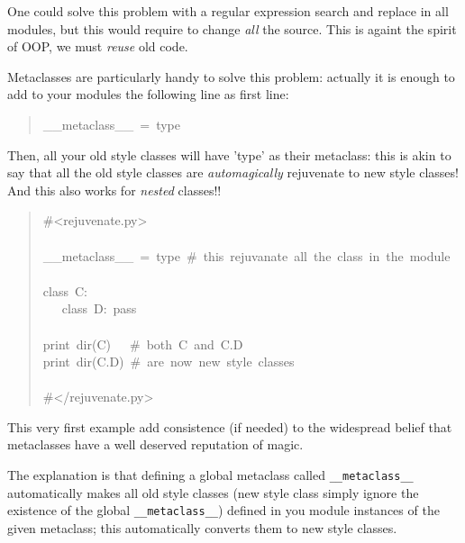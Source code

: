 \documentclass[10pt,english]{article}
\begin{document}
One could solve this problem with a regular expression search and replace
in all modules, but this would require to change \emph{all} the source.
This is againt the spirit of OOP, we must \emph{reuse} old code.

Metaclasses are particularly handy to solve this problem: actually it is
enough to add to your modules the following line as first line:
\begin{quote}
\begin{ttfamily}\begin{flushleft}
\mbox{{\_}{\_}metaclass{\_}{\_}~=~type}
\end{flushleft}\end{ttfamily}
\end{quote}

Then, all your old style classes will have 'type' as their metaclass: this
is akin to say that all the old style classes  are \emph{automagically} rejuvenate 
to new style classes! And this also works for \emph{nested} classes!!
\begin{quote}
\begin{ttfamily}\begin{flushleft}
\mbox{{\#}<rejuvenate.py>}\\
\mbox{}\\
\mbox{{\_}{\_}metaclass{\_}{\_}~=~type~{\#}~this~rejuvanate~all~the~class~in~the~module}\\
\mbox{}\\
\mbox{class~C:}\\
\mbox{~~~class~D:~pass}\\
\mbox{}\\
\mbox{print~dir(C)~~~{\#}~both~C~and~C.D}\\
\mbox{print~dir(C.D)~{\#}~are~now~new~style~classes}\\
\mbox{}\\
\mbox{{\#}</rejuvenate.py>}
\end{flushleft}\end{ttfamily}
\end{quote}

This very first example add consistence (if needed) to the
widespread belief that metaclasses have a well deserved reputation of magic.

The explanation is that defining a global metaclass called \texttt{{\_}{\_}metaclass{\_}{\_}}
automatically makes all old style classes (new style class simply ignore 
the existence of the global \texttt{{\_}{\_}metaclass{\_}{\_}})  defined in you module 
instances of the given metaclass; this automatically converts them to 
new style classes.
\end{document}
